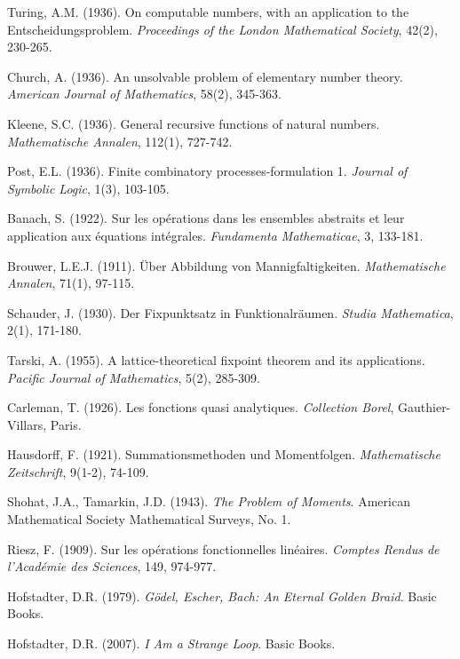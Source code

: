 \documentclass[12pt]{article}
\theoremstyle{plain}
\theoremstyle{definition}
\begin{document}
\begin{thebibliography}{99}
 Turing, A.M. (1936). On computable numbers, with an application to the Entscheidungsproblem. \emph{Proceedings of the London Mathematical Society}, 42(2), 230-265.

 Church, A. (1936). An unsolvable problem of elementary number theory. \emph{American Journal of Mathematics}, 58(2), 345-363.

 Kleene, S.C. (1936). General recursive functions of natural numbers. \emph{Mathematische Annalen}, 112(1), 727-742.

 Post, E.L. (1936). Finite combinatory processes-formulation 1. \emph{Journal of Symbolic Logic}, 1(3), 103-105.

 Banach, S. (1922). Sur les opérations dans les ensembles abstraits et leur application aux équations intégrales. \emph{Fundamenta Mathematicae}, 3, 133-181.

 Brouwer, L.E.J. (1911). Über Abbildung von Mannigfaltigkeiten. \emph{Mathematische Annalen}, 71(1), 97-115.

 Schauder, J. (1930). Der Fixpunktsatz in Funktionalräumen. \emph{Studia Mathematica}, 2(1), 171-180.

 Tarski, A. (1955). A lattice-theoretical fixpoint theorem and its applications. \emph{Pacific Journal of Mathematics}, 5(2), 285-309.

 Carleman, T. (1926). Les fonctions quasi analytiques. \emph{Collection Borel}, Gauthier-Villars, Paris.

 Hausdorff, F. (1921). Summationsmethoden und Momentfolgen. \emph{Mathematische Zeitschrift}, 9(1-2), 74-109.

 Shohat, J.A., Tamarkin, J.D. (1943). \emph{The Problem of Moments}. American Mathematical Society Mathematical Surveys, No. 1.

 Riesz, F. (1909). Sur les opérations fonctionnelles linéaires. \emph{Comptes Rendus de l'Académie des Sciences}, 149, 974-977.

 Hofstadter, D.R. (1979). \emph{Gödel, Escher, Bach: An Eternal Golden Braid}. Basic Books.

 Hofstadter, D.R. (2007). \emph{I Am a Strange Loop}. Basic Books.


\end{thebibliography}
\end{document}
